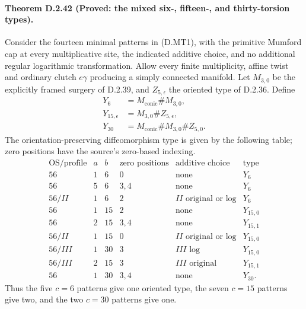 \paragraph{Theorem D.2.42 (Proved: the mixed six-, fifteen-, and thirty-torsion types).}
Consider the fourteen minimal patterns in (D.MT1), with the primitive
Mumford cap at every multiplicative site, the indicated additive
choice, and no additional regular logarithmic transformation.
Allow every finite multiplicity, affine twist and ordinary clutch
$e\gamma$ producing a simply connected manifold. Let
$M_{3,0}$ be the explicitly framed surgery of D.2.39, and
$Z_{5,\epsilon}$ the oriented type of D.2.36. Define
\[
\begin{aligned}
 Y_6&=M_{\mathrm{conic}}\# M_{3,0},\\
 Y_{15,\epsilon}&=M_{3,0}\# Z_{5,\epsilon},\\
 Y_{30}&=M_{\mathrm{conic}}\# M_{3,0}\# Z_{5,0}.
\end{aligned}
\]
The orientation-preserving diffeomorphism type is given by the
following table; zero positions have the source's zero-based indexing.
\[
\begin{array}{c|r|r|l|l|l}
\text{OS/profile}&a&b&\text{zero positions}&\text{additive choice}&\text{type}\\\hline
56&1&6&0&\text{none}&Y_6\\
56&5&6&3,4&\text{none}&Y_6\\
56/II&1&6&2&II\text{ original or log}&Y_6\\
56&1&15&2&\text{none}&Y_{15,0}\\
56&2&15&3,4&\text{none}&Y_{15,1}\\
56/II&1&15&0&II\text{ original or log}&Y_{15,0}\\
56/III&1&30&3&III\text{ log}&Y_{15,0}\\
56/III&2&15&3&III\text{ original}&Y_{15,1}\\
56&1&30&3,4&\text{none}&Y_{30}.
\end{array}                                               \tag{D.MT1}
\]
Thus the five $c=6$ patterns give one oriented type, the seven
$c=15$ patterns give two, and the two $c=30$ patterns give one.

